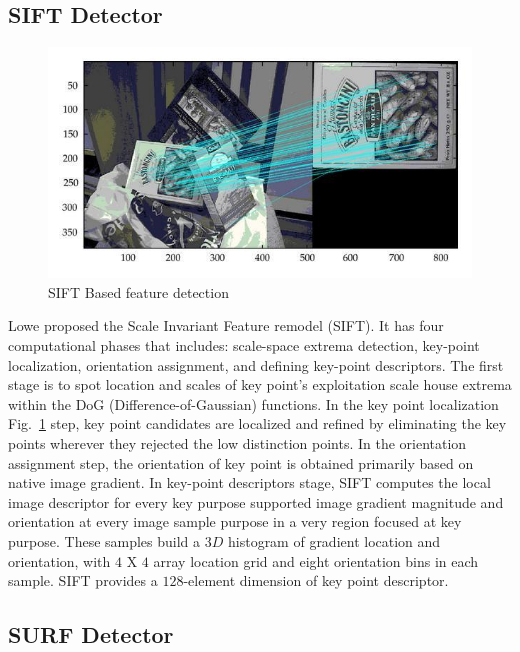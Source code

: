 \subsection{SIFT Detector}
\begin{figure}[h]
	\includegraphics[width=0.9\linewidth]{extra-7}
	\centering
	\caption{\label{fig: extra-7}SIFT Based feature detection~\cite{FeatureM52:online}}
\end{figure}
Lowe proposed the Scale Invariant Feature remodel (SIFT). It has four computational phases that includes: scale-space extrema detection, key-point localization, orientation assignment, and defining key-point descriptors. The first stage is to spot location and scales of key point’s exploitation scale house extrema within the DoG (Difference-of-Gaussian) functions. In the key point localization Fig.~\ref{fig: extra-7} step, key point candidates are localized and refined by eliminating the key points wherever they rejected the low distinction points. In the orientation assignment step, the orientation of key point is obtained primarily based on native image gradient. In key-point descriptors stage, SIFT computes the local image descriptor for every key purpose supported image gradient magnitude and orientation at every image sample purpose in a very region focused at key purpose. These samples build a $3D$ histogram of gradient location and orientation, with $4$ X $4$ array location grid and eight orientation bins in each sample. SIFT provides a $128$-element dimension of key point descriptor. 

\subsection{SURF Detector}

